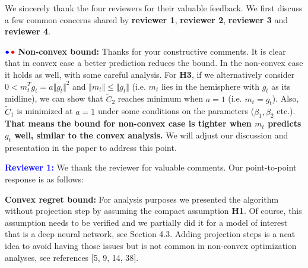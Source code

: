 \documentclass{article}
\begin{document}
We sincerely thank the four reviewers for their valuable feedback. 
We first discuss a few common concerns shared by \textbf{\color{blue}reviewer 1}, \textbf{\color{red} reviewer 2}, \textbf{\color{green!50!black}reviewer 3} and \textbf{\color{purple}reviewer 4}. \vspace{-5pt}

${\color{blue}\bullet}\!~{\color{red}\bullet}$ \textbf{Non-convex bound:} 
Thanks for your constructive comments. It is clear that in convex case a better prediction reduces the bound. In the non-convex case it holds as well, with some careful analysis. For \textbf{H3}, if we alternatively consider $0<m_t^T g_t=a\Vert g_t\Vert^2$ and $\Vert m_t\Vert\leq \Vert g_t\Vert$ (i.e. $m_t$ lies in the hemisphere with $g_t$ as its midline), we can show that $\tilde C_2$ reaches minimum when $a=1$ (i.e. $m_t=g_t$). Also, $\tilde C_1$ is minimized at $a=1$ under some conditions on the parameters ($\beta_1,\beta_2$ etc.). \textbf{That means the bound for non-convex case is tighter when $m_t$ predicts $g_t$ well, similar to the convex analysis.} We will adjust our discussion and presentation in the paper to address this point. \vspace{-5pt}

\textbf{\textcolor{blue}{Reviewer 1:}} We thank the reviewer for valuable comments. Our point-to-point response is as follows:\vspace{-5pt}


\textbf{Convex regret bound:} 
For analysis purposes we presented the algorithm without projection step by assuming the compact assumption \textbf{H1}.
Of course, this assumption needs to be verified and we partially did it for a model of interest that is a deep neural network, see Section 4.3.
Adding projection steps is a neat idea to avoid having those issues but is not common in non-convex optimization analyses, see references [5, 9, 14, 38].\vspace{-5pt}
\end{document}
